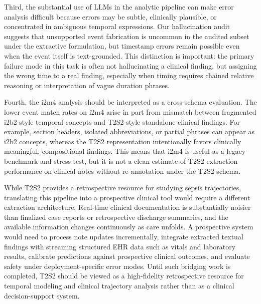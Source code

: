 \documentclass[pmlr,twocolumn,10pt]{jmlr} %
\begin{document}
Third, the substantial use of LLMs in the analytic pipeline can make error analysis difficult because errors may be subtle, clinically plausible, or concentrated in ambiguous temporal expressions.
Our hallucination audit suggests that unsupported event fabrication is uncommon in the audited subset under the extractive formulation, but timestamp errors remain possible even when the event itself is text-grounded.
This distinction is important: the primary failure mode in this task is often not hallucinating a clinical finding, but assigning the wrong time to a real finding, especially when timing requires chained relative reasoning or interpretation of vague duration phrases.

Fourth, the i2m4 analysis should be interpreted as a cross-schema evaluation.
The lower event match rates on i2m4 arise in part from mismatch between fragmented i2b2-style temporal concepts and T2S2-style standalone clinical findings.
For example, section headers, isolated abbreviations, or partial phrases can appear as i2b2 concepts, whereas the T2S2 representation intentionally favors clinically meaningful, compositional findings.
This means that i2m4 is useful as a legacy benchmark and stress test, but it is not a clean estimate of T2S2 extraction performance on clinical notes without re-annotation under the T2S2 schema.

While T2S2 provides a retrospective resource for studying sepsis trajectories, translating this pipeline into a prospective clinical tool would require a different extraction architecture.
Real-time clinical documentation is substantially noisier than finalized case reports or retrospective discharge summaries, and the available information changes continuously as care unfolds.
A prospective system would need to process note updates incrementally, integrate extracted textual findings with streaming structured EHR data such as vitals and laboratory results, calibrate predictions against prospective clinical outcomes, and evaluate safety under deployment-specific error modes.
Until such bridging work is completed, T2S2 should be viewed as a high-fidelity retrospective resource for temporal modeling and clinical trajectory analysis rather than as a clinical decision-support system.
\end{document}
